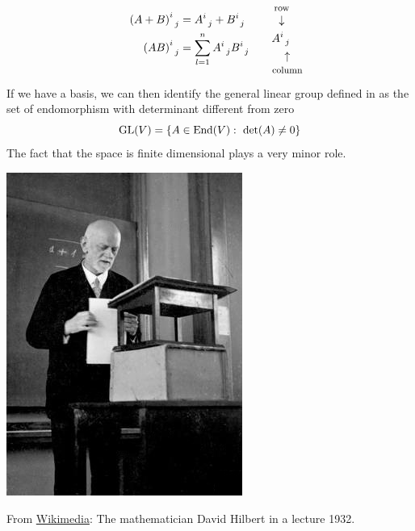 \documentclass[../main.tex]{subfiles}
\begin{document}
\[
\begin{split}
    \pqty{A+B}^i_{\; \; j}&=A^i_{\;\;j}+B^i_{\;\;j}\\
    \pqty{AB}^i_{\;\;j}&=\sum_{l=1}^n A^i_{\;\;j}B^i_{\;\;j}
\end{split}
\qquad A^{\overset{\mathclap{\tikz \node {$\downarrow$} node [above=1.25ex] {\footnotesize row};}}{i}}_{\;\;\underset{\mathclap{\tikz \node {$\uparrow$} node [below=1.25ex] {\footnotesize column };}}{j}}
\]
If we have a basis, we can then identify the general linear group defined in  as the set of endomorphism with determinant different from zero
\[
\textrm{GL}(V)=\Bqty{A\in \textrm{End}(V): \ \textrm{det}(A)\neq 0}
\]
The fact that the space is finite dimensional plays a very minor role.
\begin{marginfigure}[-20mm]
     \includegraphics[width=1\linewidth]{images/David_Hilbert_Vorlesung_1932.jpg}
     \caption[Photo of Hibert]{From \href{https://commons.wikimedia.org/wiki/File:David_Hilbert_Vorlesung_1932.jpg?uselang=it}{Wikimedia}: The mathematician David Hilbert in a lecture 1932.}
 \end{marginfigure}
\end{document}
